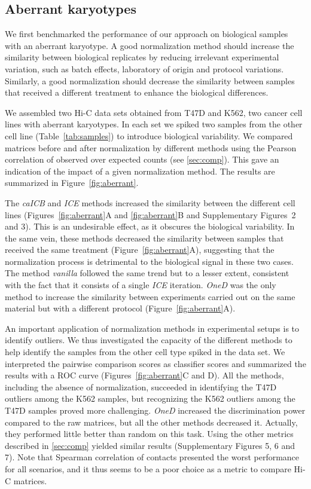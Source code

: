 \documentclass{bioinfo}
\begin{document}
\subsection{Aberrant karyotypes}

We first benchmarked the performance of our approach on biological
samples with an aberrant karyotype. A good normalization method should
increase the similarity between biological replicates by reducing
irrelevant experimental variation, such as batch effects, laboratory of
origin and protocol variations. Similarly, a good normalization should
decrease the similarity between samples that received a different
treatment to enhance the biological differences.

We assembled two Hi-C data sets obtained from T47D and K562, two cancer
cell lines with aberrant karyotypes. In each set we spiked two samples
from the other cell line (Table~\ref{tab:samples}) to
introduce biological variability. We compared matrices before and after
normalization by different methods using the Pearson correlation of
observed over expected counts (see \ref{sec:comp}). This gave an
indication of the impact of a given normalization method. The results are
summarized in Figure~\ref{fig:aberrant}.

The \textit{caICB} and \textit{ICE} methods increased the similarity
between the different cell lines (Figures~\ref{fig:aberrant}A and
\ref{fig:aberrant}B and Supplementary Figures~2 and 3). This is an undesirable
effect, as it obscures the biological variability. In the same vein, these
methods decreased the similarity between samples that received the same
treatment (Figure~\ref{fig:aberrant}A), suggesting that the normalization
process is detrimental to the biological signal in these two cases. The
method \textit{vanilla} followed the same trend but to a lesser extent,
consistent with the fact that it consists of a single \textit{ICE}
iteration. \textit{OneD} was the only method to increase the similarity
between experiments carried out on the same material but with a different
protocol (Figure~\ref{fig:aberrant}A).

An important application of normalization methods in experimental setups
is to identify outliers. We thus investigated the capacity of the
different methods to help identify the samples from the other cell type
spiked in the data set. We interpreted the pairwise comparison scores as
classifier scores and summarized the results with a ROC curve
(Figures~\ref{fig:aberrant}C and D). All the methods, including the absence of
normalization, succeeded in identifying the T47D outliers among the K562
samples, but recognizing the K562 outliers among the T47D samples proved more
challenging. \textit{OneD} increased the discrimination power compared to the
raw matrices, but all the other methods decreased it. Actually, they performed
little better than random on this task. Using the other metrics described
in \ref{sec:comp} yielded similar results (Supplementary Figures 5, 6 and
7). Note that Spearman correlation of contacts presented the worst performance
for all scenarios, and it thus seems to be a poor choice as a metric to compare
Hi-C matrices.
\end{document}
